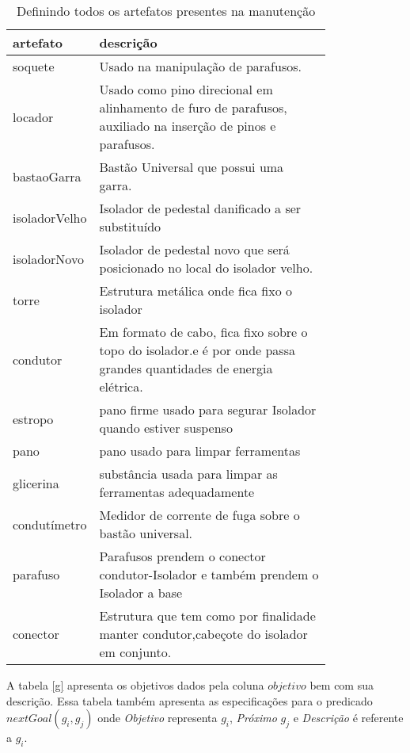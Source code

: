 \begin{table}[H]
\centering
\begin{tabular}{|l|p{0.8\linewidth}|}
\hline
\textbf{artefato} & \textbf{descrição} \\ \hline
soquete & Usado na manipulação de parafusos. \\ \hline
locador & Usado como pino direcional em alinhamento de furo de parafusos, auxiliado na inserção de pinos e parafusos. \\ \hline
bastaoGarra & Bastão Universal que possui uma garra. \\ \hline
isoladorVelho & Isolador de pedestal danificado a ser substituído \\ \hline
isoladorNovo & Isolador de pedestal novo que será posicionado no local do isolador velho. \\ \hline
torre & Estrutura metálica onde fica fixo o isolador \\ \hline
condutor & Em formato de cabo, fica fixo sobre o topo do isolador.e é por onde passa grandes quantidades de energia elétrica. \\ \hline
estropo & pano firme usado para segurar Isolador quando estiver suspenso \\ \hline
pano & pano usado para limpar ferramentas \\ \hline
glicerina & substância usada para limpar as ferramentas adequadamente \\ \hline
condutímetro & Medidor de corrente de fuga sobre o bastão universal. \\ \hline
parafuso & Parafusos prendem o conector condutor-Isolador e também prendem o Isolador a base \\ \hline
conector & Estrutura que tem como por finalidade manter condutor,cabeçote do isolador em conjunto. \\ \hline
\end{tabular}
\caption{Definindo todos os artefatos presentes na manutenção}
\label{artefacts2}
\end{table} 

A tabela \ref{g} apresenta os objetivos dados pela coluna $objetivo$ bem com sua descrição. Essa tabela também apresenta as especificações para o predicado $nextGoal(g_i,g_j)$ 
onde \textit{Objetivo} representa $g_i$, \textit{Próximo} $g_j$ e \textit{Descrição} é referente a $g_i$.

